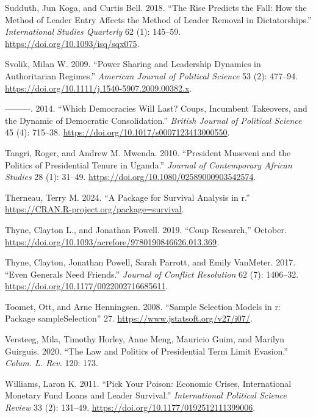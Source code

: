 \documentclass[
  12pt,
]{report}
\newlength{\cslhangindent}
\newenvironment{CSLReferences}[2] %
 {\begin{list}{}{%
  \setlength{\itemindent}{0pt}
  \setlength{\leftmargin}{0pt}
  \setlength{\parsep}{0pt}
  \ifodd #1
   \setlength{\leftmargin}{\cslhangindent}
   \setlength{\itemindent}{-1\cslhangindent}
  \fi
  \setlength{\itemsep}{#2\baselineskip}}}
 {\end{list}}
\begin{document}
\begin{CSLReferences}{1}{0}
Sudduth, Jun Koga, and Curtis Bell. 2018. {``The Rise Predicts the Fall:
How the Method of Leader Entry Affects the Method of Leader Removal in
Dictatorships.''} \emph{International Studies Quarterly} 62 (1):
145--59. \url{https://doi.org/10.1093/isq/sqx075}.

Svolik, Milan W. 2009. {``Power Sharing and Leadership Dynamics in
Authoritarian Regimes.''} \emph{American Journal of Political Science}
53 (2): 477--94. \url{https://doi.org/10.1111/j.1540-5907.2009.00382.x}.

---------. 2014. {``Which Democracies Will Last? Coups, Incumbent
Takeovers, and the Dynamic of Democratic Consolidation.''} \emph{British
Journal of Political Science} 45 (4): 715--38.
\url{https://doi.org/10.1017/s0007123413000550}.

Tangri, Roger, and Andrew M. Mwenda. 2010. {``President Museveni and the
Politics of Presidential Tenure in Uganda.''} \emph{Journal of
Contemporary African Studies} 28 (1): 31--49.
\url{https://doi.org/10.1080/02589000903542574}.

Therneau, Terry M. 2024. {``A Package for Survival Analysis in r.''}
\url{https://CRAN.R-project.org/package=survival}.

Thyne, Clayton L., and Jonathan Powell. 2019. {``Coup Research,''}
October. \url{https://doi.org/10.1093/acrefore/9780190846626.013.369}.

Thyne, Clayton, Jonathan Powell, Sarah Parrott, and Emily VanMeter.
2017. {``Even Generals Need Friends.''} \emph{Journal of Conflict
Resolution} 62 (7): 1406--32.
\url{https://doi.org/10.1177/0022002716685611}.

Toomet, Ott, and Arne Henningsen. 2008. {``Sample Selection Models in
{\textbraceleft}r{\textbraceright}: Package
{\textbraceleft}sampleSelection{\textbraceright}''} 27.
\url{https://www.jstatsoft.org/v27/i07/}.

Versteeg, Mila, Timothy Horley, Anne Meng, Mauricio Guim, and Marilyn
Guirguis. 2020. {``The Law and Politics of Presidential Term Limit
Evasion.''} \emph{Colum. L. Rev.} 120: 173.

Williams, Laron K. 2011. {``Pick Your Poison: Economic Crises,
International Monetary Fund Loans and Leader Survival.''}
\emph{International Political Science Review} 33 (2): 131--49.
\url{https://doi.org/10.1177/0192512111399006}.


\end{CSLReferences}
\end{document}
